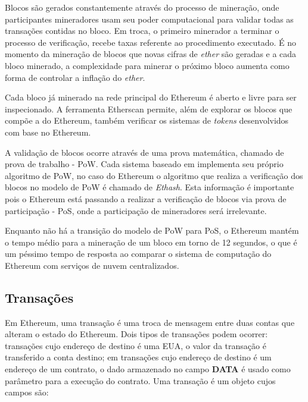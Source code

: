 \documentclass[tcc,capa]{texufpel}
\begin{document}
	Blocos são gerados constantemente através do processo de mineração, onde participantes mineradores usam seu poder computacional para validar todas as transações contidas no bloco. Em troca, o primeiro minerador a terminar o processo de verificação, recebe taxas referente ao procedimento executado. É no momento da mineração de blocos que novas cifras de \textit{ether} são geradas e a cada bloco minerado, a complexidade para minerar o próximo bloco aumenta como forma de controlar a inflação do \textit{ether}.
	
	Cada bloco já minerado na rede principal do Ethereum é aberto e livre para ser inspecionado. A ferramenta Etherscan \cite{team2017etherscan} permite, além de explorar os blocos que compõe a \bchain do Ethereum, também verificar os sistemas de \textit{tokens} desenvolvidos com base no Ethereum.
	
	A validação de blocos ocorre através de uma prova matemática, chamado de prova de trabalho - PoW. Cada sistema baseado em \bchain implementa seu próprio algoritmo de PoW, no caso do Ethereum o algoritmo que realiza a verificação dos blocos no modelo de PoW é chamado de \textit{Ethash}. Esta informação é importante pois o Ethereum está passando a realizar a verificação de blocos via prova de participação - PoS, onde a participação de mineradores será irrelevante.
	
	Enquanto não há a transição do modelo de PoW para PoS, o Ethereum mantém o tempo médio para a mineração de um bloco em torno de 12 segundos, o que é um péssimo tempo de resposta ao comparar o sistema de computação do Ethereum com serviços de nuvem centralizados.


    
	\subsection{Transações}\label{ssc:transacoes}
	
	Em Ethereum, uma transação é uma troca de mensagem entre duas contas que alteram o estado do Ethereum. Dois tipos de transações podem ocorrer: transações cujo endereço de destino é uma EUA, o valor da transação é transferido a conta destino; em transações cujo endereço de destino é um endereço de um contrato, o dado armazenado no campo \textbf{DATA} é usado como parâmetro para a execução do contrato. Uma transação é um objeto cujos campos são:
	
\end{document}
